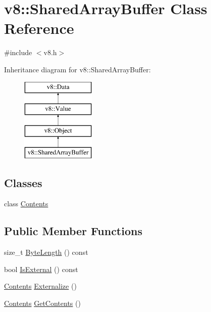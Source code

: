 \hypertarget{classv8_1_1_shared_array_buffer}{}\section{v8\+:\+:Shared\+Array\+Buffer Class Reference}
\label{classv8_1_1_shared_array_buffer}


{\ttfamily \#include $<$v8.\+h$>$}

Inheritance diagram for v8\+:\+:Shared\+Array\+Buffer\+:\begin{figure}[H]
\begin{center}
\leavevmode
\includegraphics[height=4.000000cm]{classv8_1_1_shared_array_buffer}
\end{center}
\end{figure}
\subsection*{Classes}
\begin{DoxyCompactItemize}
\item 
class \hyperlink{classv8_1_1_shared_array_buffer_1_1_contents}{Contents}
\end{DoxyCompactItemize}
\subsection*{Public Member Functions}
\begin{DoxyCompactItemize}
\item 
size\+\_\+t \hyperlink{classv8_1_1_shared_array_buffer_a09cfb461e2f3f8e1fca53a4a2fbfd8df}{Byte\+Length} () const 
\item 
bool \hyperlink{classv8_1_1_shared_array_buffer_a37e7ba1ed5a1422af9928697ea6a960b}{Is\+External} () const 
\item 
\hyperlink{classv8_1_1_shared_array_buffer_1_1_contents}{Contents} \hyperlink{classv8_1_1_shared_array_buffer_afe025bbf668e64439cfc0044b353eb41}{Externalize} ()
\item 
\hyperlink{classv8_1_1_shared_array_buffer_1_1_contents}{Contents} \hyperlink{classv8_1_1_shared_array_buffer_af5a160b645c5c674450d9501697c2cf4}{Get\+Contents} ()
\end{DoxyCompactItemize}
